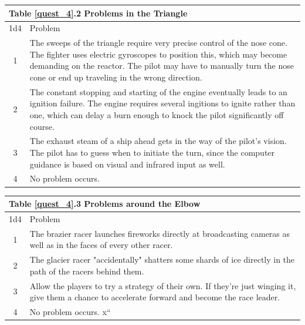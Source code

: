 \documentclass[a4paper]{article}
\begin{document}
\vspace{0.2cm}
\begin{tabular}[t]{| c | p{12.5cm} |}
\toprule
\multicolumn{2}{|l|}{Table \ref{quest_4}.2 Problems in the Triangle} \\
\midrule
1d4 & Problem \\
\midrule
1 & The sweeps of the triangle require very precise control of the nose cone. The fighter uses electric gyroscopes to position this, which may become demanding on the reactor. The pilot may have to manually turn the nose cone or end up traveling in the wrong direction. \\
2 & The constant stopping and starting of the engine eventually leads to an ignition failure. The engine requires several ingitions to ignite rather than one, which can delay a burn enough to knock the pilot significantly off course. \\
3 & The exhaust steam of a ship ahead gets in the way of the pilot's vision. The pilot has to guess when to initiate the turn, since the computer guidance is based on visual and infrared input as well. \\
4 & No problem occurs. \\
\bottomrule
\end{tabular}

\vspace{0.2cm}
\begin{tabular}[t]{| c | p{12.5cm} |}
\toprule
\multicolumn{2}{|l|}{Table \ref{quest_4}.3 Problems around the Elbow} \\
\midrule
1d4 & Problem \\
\midrule
1 & The brazier racer launches fireworks directly at broadcasting cameras as well as in the faces of every other racer. \\
2 & The glacier racer "accidentally" shatters some shards of ice directly in the path of the racers behind them. \\
3 & Allow the players to try a strategy of their own. If they're just winging it, give them a chance to accelerate forward and become the race leader. \\ 
4 & No problem occurs. x``\\
\bottomrule
\end{tabular}
\end{document}
